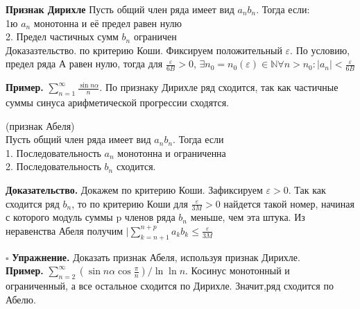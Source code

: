 \textbf{Признак Дирихле}
Пусть общий член ряда имеет вид $a_nb_n$.
Тогда если:\\
1ю $a_n$ монотонна и её предел равен нулю \\
2. Предел  частичных сумм $b_n$ ограничен\\
Доказазтельство. по критерию Коши. Фиксируем положительный $\varepsilon$.
По условию, предел ряда А равен нулю, тогда для $\frac{\varepsilon}{6B}>0$,
$\exists n_0=n_0(\varepsilon)\in\mathbb{N}\forall n>n_0:
|a_n|<\frac{\varepsilon}{6B}$ 

\textbf{Пример.} $\sum\limits_{n=1}^{\infty} \frac{\sin{n\alpha}}{n}$. 
По признаку Дирихле ряд сходится, так как частичные суммы синуса 
арифметической прогрессии сходятся.

\begin{theor}
    (признак Абеля)\\
    Пусть общий член ряда имеет вид $a_nb_n$. Тогда если \\
    1. Последовательность  $a_n$ монотонна и ограниченна\\
    2. Последовательность  $b_n$ сходится.
\end{theor}
\textbf{Доказательство.}  Докажем по критерию Коши. Зафиксируем 
$\varepsilon>0$. Так как сходится ряд $b_n$, то по критерию Коши для 
 $\frac{\varepsilon}{3M}>0$ найдется такой номер, начиная с которого модуль
 суммы p членов ряда $b_n$ меньше, чем эта штука. Из неравенства Абеля получим
$|\sum\limits_{k=n+1}^{n+p} a_k b_k\leqslant \frac{\varepsilon}{3M}$

$\square$ 
\textbf{Упражнение.} Доказать признак Абеля, используя признак Дирихле. \\
\textbf{Пример.} $\sum\limits_{n=2}^{\infty} (\sin{n\alpha}
\cos{\frac{\pi}{n}})/\ln{\ln{n}}$. Косинус монотонный и ограниченный, 
а все остальное сходится по Дирихле. Значит,ряд сходится по Абелю.\\
